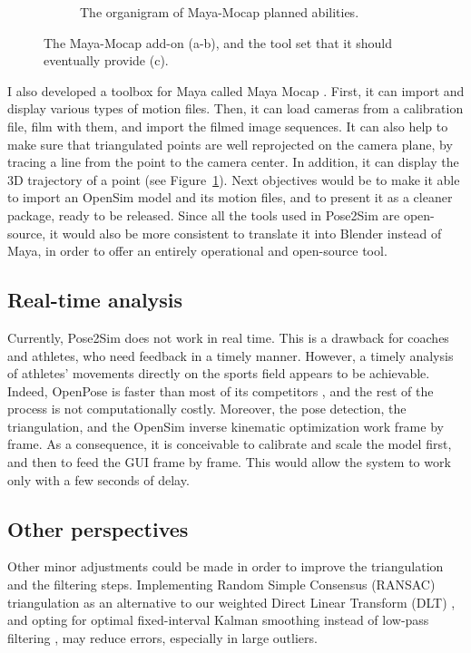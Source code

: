 \begin{figure}[hbtp!]
\begin{subfigure}[b]{1\textwidth}
            \caption{The organigram of Maya-Mocap planned abilities.}
      \end{subfigure}
 	\caption{The Maya-Mocap add-on (a-b), and the tool set that it should eventually provide (c).}
	\label{fig_mayamocap}
\end{figure}

I also developed a toolbox for Maya \cite{Maya1998} called Maya Mocap \cite{Pagnon2020}. First, it can import and display various types of motion files. Then, it can load cameras from a calibration file, film with them, and import the filmed image sequences. It can also help to make sure that triangulated points are well reprojected on the camera plane, by tracing a line from the point to the camera center. In addition, it can display the 3D trajectory of a point (see Figure~\ref{fig_mayamocap}). Next objectives would be to make it able to import an OpenSim model and its motion files, and to present it as a cleaner package, ready to be released. Since all the tools used in Pose2Sim are open-source, it would also be more consistent to translate it into Blender instead of Maya, in order to offer an entirely operational and open-source tool.


\subsection{Real-time analysis}\label{subsec:realtime}

Currently, Pose2Sim does not work in real time. This is a drawback for coaches and athletes, who need feedback in a timely manner. However, a timely analysis of athletes’ movements directly on the sports field appears to be achievable. Indeed, OpenPose is faster than most of its competitors \cite{Chen2020}, and the rest of the process is not computationally costly. Moreover, the pose detection, the triangulation, and the OpenSim inverse kinematic optimization work frame by frame. As a consequence, it is conceivable to calibrate and scale the model first, and then to feed the GUI frame by frame. This would allow the system to work only with a few seconds of delay.


\subsection{Other perspectives}

Other minor adjustments could be made in order to improve the triangulation and the filtering steps. Implementing Random Simple Consensus (RANSAC) triangulation \cite{Fischler1981} as an alternative to our weighted Direct Linear Transform (DLT) \cite{Pagnon2021}, and opting for optimal fixed-interval Kalman smoothing instead of low-pass filtering \cite{Rauch1965,Needham2021a}, may reduce errors, especially in large outliers.